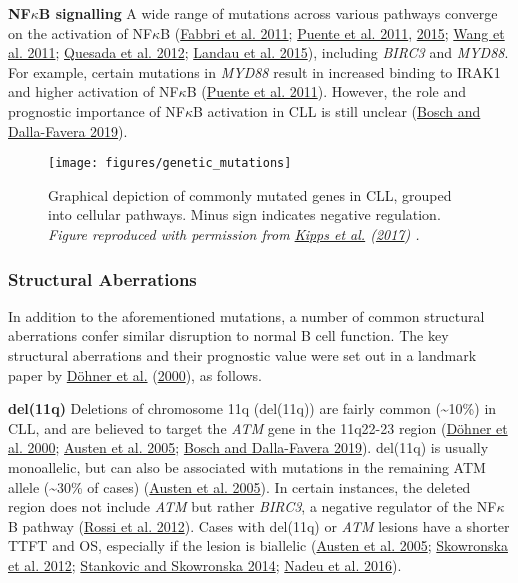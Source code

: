 \documentclass[11pt, a4paper, twosided]{book}
\begin{document}
\textbf{NF\(\kappa\)B signalling}
A wide range of mutations across various pathways converge on the activation of NF\(\kappa\)B (\protect\hyperlink{ref-Fabbri2011}{Fabbri et al. 2011}; \protect\hyperlink{ref-Puente2011}{Puente et al. 2011}, \protect\hyperlink{ref-Puente2015}{2015}; \protect\hyperlink{ref-Wang2011}{Wang et al. 2011}; \protect\hyperlink{ref-Quesada2012}{Quesada et al. 2012}; \protect\hyperlink{ref-Landau2015}{Landau et al. 2015}), including \emph{BIRC3} and \emph{MYD88}. For example, certain mutations in \emph{MYD88} result in increased binding to IRAK1 and higher activation of NF\(\kappa\)B (\protect\hyperlink{ref-Puente2011}{Puente et al. 2011}). However, the role and prognostic importance of NF\(\kappa\)B activation in CLL is still unclear (\protect\hyperlink{ref-Bosch2019}{Bosch and Dalla-Favera 2019}).


\begin{figure}

{\centering \texttt{[image: figures/genetic\_mutations]} 

}

\caption{Graphical depiction of commonly mutated genes in CLL, grouped into cellular pathways. Minus sign indicates negative regulation. \emph{Figure reproduced with permission from \protect\hyperlink{ref-Kipps2017}{Kipps et al.} (\protect\hyperlink{ref-Kipps2017}{2017}) .}}\label{fig:CLLmutations}
\end{figure}
\hypertarget{intro-structural-abberations}{%
\subsubsection{Structural Aberrations}\label{intro-structural-abberations}}

In addition to the aforementioned mutations, a number of common structural aberrations confer similar disruption to normal B cell function. The key structural aberrations and their prognostic value were set out in a landmark paper by \protect\hyperlink{ref-Dohner2000}{Döhner et al.} (\protect\hyperlink{ref-Dohner2000}{2000}), as follows.

\textbf{del(11q)}
Deletions of chromosome 11q (del(11q)) are fairly common (\textasciitilde10\%) in CLL, and are believed to target the \emph{ATM} gene in the 11q22-23 region (\protect\hyperlink{ref-Dohner2000}{Döhner et al. 2000}; \protect\hyperlink{ref-Austen2005}{Austen et al. 2005}; \protect\hyperlink{ref-Bosch2019}{Bosch and Dalla-Favera 2019}). del(11q) is usually monoallelic, but can also be associated with mutations in the remaining ATM allele (\textasciitilde30\% of cases) (\protect\hyperlink{ref-Austen2005}{Austen et al. 2005}). In certain instances, the deleted region does not include \emph{ATM} but rather \emph{BIRC3}, a negative regulator of the NF\(\kappa\)B pathway (\protect\hyperlink{ref-Rossi2012}{Rossi et al. 2012}). Cases with del(11q) or \emph{ATM} lesions have a shorter TTFT and OS, especially if the lesion is biallelic (\protect\hyperlink{ref-Austen2005}{Austen et al. 2005}; \protect\hyperlink{ref-Skowronska2012}{Skowronska et al. 2012}; \protect\hyperlink{ref-Stankovic2014}{Stankovic and Skowronska 2014}; \protect\hyperlink{ref-Nadeu2016}{Nadeu et al. 2016}).
\end{document}
